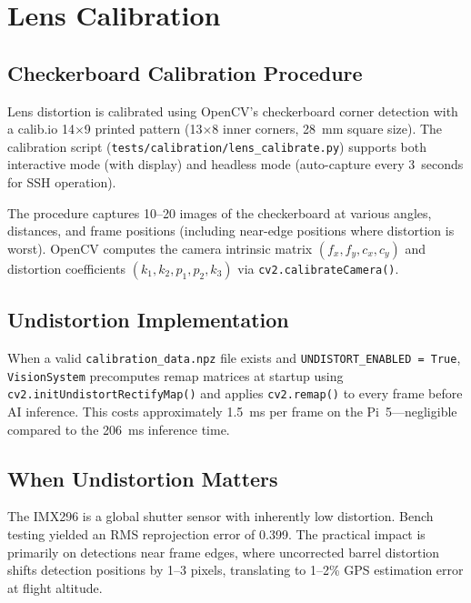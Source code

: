 \section{Lens Calibration}
\label{sec:lens-calibration}

\subsection{Checkerboard Calibration Procedure}

Lens distortion is calibrated using OpenCV's checkerboard corner detection with a
calib.io 14$\times$9 printed pattern (13$\times$8 inner corners, 28~mm square size).
The calibration script (\texttt{tests/calibration/lens\_calibrate.py}) supports both
interactive mode (with display) and headless mode (auto-capture every 3~seconds
for SSH operation).

The procedure captures 10--20 images of the checkerboard at various angles, distances,
and frame positions (including near-edge positions where distortion is worst). OpenCV
computes the camera intrinsic matrix $(f_x, f_y, c_x, c_y)$ and distortion coefficients
$(k_1, k_2, p_1, p_2, k_3)$ via \texttt{cv2.calibrateCamera()}.

\subsection{Undistortion Implementation}

When a valid \texttt{calibration\_data.npz} file exists and
\texttt{UNDISTORT\_ENABLED = True}, \texttt{VisionSystem} precomputes remap matrices
at startup using \texttt{cv2.initUndistortRectifyMap()} and applies
\texttt{cv2.remap()} to every frame before AI inference. This costs approximately
1.5~ms per frame on the Pi~5---negligible compared to the 206~ms inference time.

\subsection{When Undistortion Matters}

The IMX296 is a global shutter sensor with inherently low distortion. Bench testing
yielded an RMS reprojection error of 0.399. The practical impact is primarily on
detections near frame edges, where uncorrected barrel distortion shifts detection
positions by 1--3 pixels, translating to 1--2\% GPS estimation error at flight altitude.

